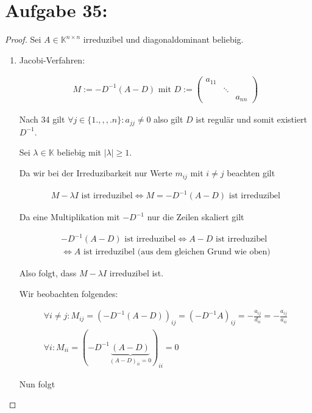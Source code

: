 \documentclass[]{article}
\begin{document}
\section{Aufgabe 35:}
\begin{proof}
	Sei $A\in\mathbb{K}^{n\times n}$ irreduzibel und diagonaldominant beliebig.
	
	\begin{enumerate}
		\item Jacobi-Verfahren:
		
		\begin{align*}
			M:=-D^{-1}(A-D) \text{ mit } D:=\begin{pmatrix}
				a_{11} & & \\
				& \ddots & \\
				& & a_{nn}
			\end{pmatrix}
		\end{align*}
	
		Nach 34 gilt $\forall j\in\{1.,,,.n\}: a_{jj}\neq 0$ also gilt $D$ ist regulär und somit existiert $D^{-1}$.
		
		Sei $\lambda\in\mathbb{K}$ beliebig mit $|\lambda|\geq 1$.
		
		Da wir bei der Irreduzibarkeit nur Werte $m_{ij}$ mit $i\neq j$ beachten gilt
		
		\begin{align*}
			M-\lambda I \text{ ist irreduzibel} \iff M = -D^{-1}(A-D) \text{ ist irreduzibel}
		\end{align*}
	
		Da eine Multiplikation mit $-D^{-1}$ nur die Zeilen skaliert gilt
		
		\begin{align*}
			-D^{-1}(A-D) \text{ ist irreduzibel} \iff A-D \text{ ist irreduzibel} \\ \iff A \text{ ist irreduzibel (aus dem gleichen Grund wie oben)}
		\end{align*}
	
		Also folgt, dass $M-\lambda I$ irreduzibel ist.
		
		Wir beobachten folgendes:
		
		\begin{align*}
			\forall i\neq j: M_{ij} = (-D^{-1}(A-D))_{ij} = (-D^{-1}A)_{ij} = -\frac{a_{ij}}{d_{ii}} = -\frac{a_{ij}}{a_{ii}} \\
			\forall i: M_{ii} = (-D^{-1}\underbrace{(A-D)}_{(A-D)_{ii}=0})_{ii} = 0
		\end{align*}
	
		Nun folgt
		

\end{enumerate}
\end{proof}
\end{document}
